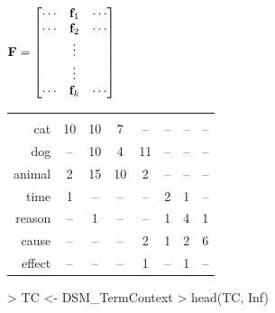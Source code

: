 \documentclass[t]{beamer} %
\begin{document}
\begin{frame}[fragile]
  \gap[2]
  \begin{center}
  \(
  \mathbf{F} = 
  \begin{bmatrix}
    \cdots & \vf_1 & \cdots \\
    \cdots & \vf_2 & \cdots \\
    & \vdots & \\
    & \vdots & \\
    \cdots & \vf_k & \cdots \\
  \end{bmatrix}
  \)
  \hspace{5mm}
  \begin{small}
    \setlength{\arrayrulewidth}{1pt}
    \begin{tabular}[c]{r*{7}{|c}|}
      & 
      & 
      & 
      & 
      & 
      & 
      &  \\
      cat      &      10 &  10 &     7 &    -- &         -- &   -- &        -- \\
      dog      &      -- &  10 &     4 &    11 &         -- &   -- &        -- \\
      animal   &       2 &  15 &    10 &     2 &         -- &   -- &        -- \\
      time     &       1 &  -- &    -- &    -- &          2 &    1 &        -- \\
      reason   &      -- &   1 &    -- &    -- &          1 &    4 &         1 \\
      cause    &      -- &  -- &    -- &     2 &          1 &    2 &         6 \\
      effect   &      -- &  -- &    -- &     1 &         -- &    1 &        -- \\
    \end{tabular}
  \end{small}
  \end{center}

\begin{Rcode}
> TC <- DSM_TermContext
> head(TC, Inf) 
\end{Rcode}
\end{frame}
\end{document}
